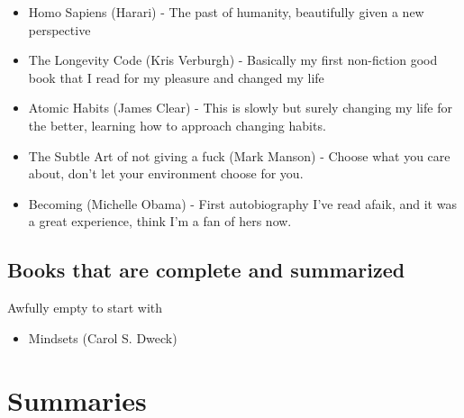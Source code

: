 \documentclass[12pt,a4paper]{article}
\begin{document}
\begin{itemize}
\item Homo Sapiens (Harari) - The past of humanity, beautifully given a new perspective
\item The Longevity Code (Kris Verburgh) - Basically my first non-fiction good book that I read for my pleasure and changed my life
\item Atomic Habits (James Clear) - This is slowly but surely changing my life for the better, learning how to approach changing habits.
\item The Subtle Art of not giving a fuck (Mark Manson) - Choose what you care about, don't let your environment choose for you.
\item Becoming (Michelle Obama) - First autobiography I've read afaik, and it was a great experience, think I'm a fan of hers now.
\end{itemize}

\subsection{Books that are complete and summarized}
Awfully empty to start with
\begin{itemize}
\item  Mindsets (Carol S. Dweck)
\end{itemize}


\section{Summaries}



























\end{document}
